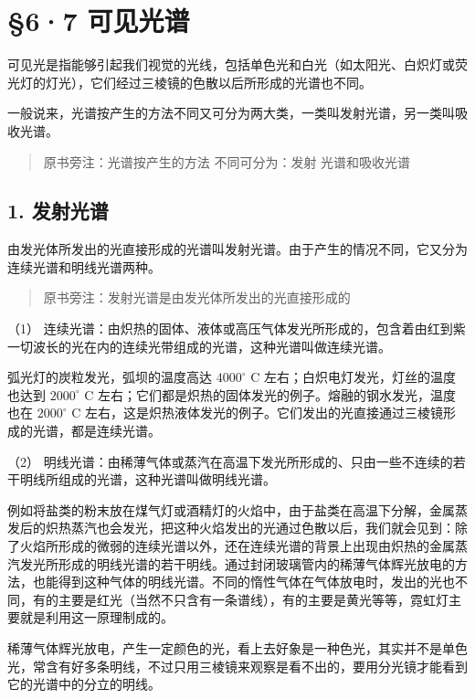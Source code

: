 \section{§6·7 可见光谱}

可见光是指能够引起我们视觉的光线，包括单色光和白光（如太阳光、白炽灯或荧光灯的灯光），它们经过三棱镜的色散以后所形成的光谱也不同。

一般说来，光谱按产生的方法不同又可分为两大类，一类叫发射光谱，另一类叫吸收光谱。

\begin{quote}
原书旁注：光谱按产生的方法 不同可分为：发射 光谱和吸收光谱
\end{quote}

\subsection{1. 发射光谱}

由发光体所发出的光直接形成的光谱叫发射光谱。由于产生的情况不同，它又分为连续光谱和明线光谱两种。

\begin{quote}
原书旁注：发射光谱是由发光体所发出的光直接形成的
\end{quote}

（1）
连续光谱：由炽热的固体、液体或高压气体发光所形成的，包含着由红到紫一切波长的光在内的连续光带组成的光谱，这种光谱叫做连续光谱。

弧光灯的炭粒发光，弧坝的温度高达 \(4000^{\circ}\) C
左右；白炽电灯发光，灯丝的温度也达到 \(2000^{\circ}\) C
左右；它们都是炽热的固体发光的例子。熔融的钢水发光，温度也在
\(2000^{\circ}\) C
左右，这是炽热液体发光的例子。它们发出的光直接通过三棱镜形成的光谱，都是连续光谱。

（2）
明线光谱：由稀薄气体或蒸汽在高温下发光所形成的、只由一些不连续的若干明线所组成的光谱，这种光谱叫做明线光谱。

例如将盐类的粉末放在煤气灯或酒精灯的火焰中，由于盐类在高温下分解，金属蒸发后的炽热蒸汽也会发光，把这种火焰发出的光通过色散以后，我们就会见到：除了火焰所形成的微弱的连续光谱以外，还在连续光谱的背景上出现由炽热的金属蒸汽发光所形成的明线光谱的若干明线。通过封闭玻璃管内的稀薄气体辉光放电的方法，也能得到这种气体的明线光谱。不同的惰性气体在气体放电时，发出的光也不同，有的主要是红光（当然不只含有一条谱线），有的主要是黄光等等，霓虹灯主要就是利用这一原理制成的。

稀薄气体辉光放电，产生一定颜色的光，看上去好象是一种色光，其实并不是单色光，常含有好多条明线，不过只用三棱镜来观察是看不出的，要用分光镜才能看到它的光谱中的分立的明线。

